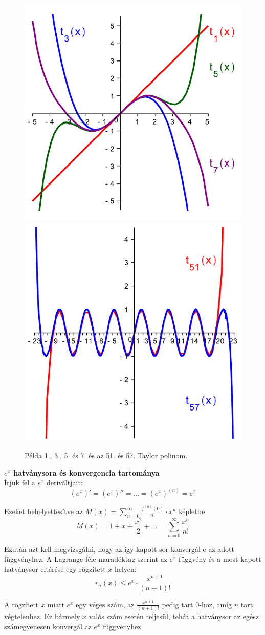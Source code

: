 \documentclass[tikz,12pt,margin=0px]{article}
\newcommand\ddfrac[2]{\frac{\displaystyle #1}{\displaystyle #2}}
\begin{document}
	\begin{figure}[H]
		\centering
		\includegraphics[width=0.48\linewidth]{img/taylor_sinx_1_3_5_7.png}
		\includegraphics[width=0.48\linewidth]{img/taylor_sinx_51_57.png}
		\caption{Példa 1., 3., 5. és 7. és az 51. és 57. Taylor polinom.}
		\label{fig:newton_pelda}
	\end{figure}

\newpage
    \noindent \textbf{${e^{x}}$ hatványsora és konvergencia tartománya}\\

    \noindent Írjuk fel a $e^{x}$ deriváltjait:
    \[
        (e^{x})' = (e^{x})'' = \ldots = (e^{x})^{(n)} = e^{x}
    \]

    \noindent Ezeket behelyettesítve az $M(x) = \sum\limits_{n=0}^{\infty}\ddfrac{f^{(n)}(0)}{n!} \cdot x^{n}$ képletbe
    \[
        M(x) = 1 + x + \ddfrac{x^2}{2} + \ldots = \sum\limits_{n=0}^{\infty}\ddfrac{x^{n}}{n!}
    \]

    \noindent Ezután azt kell megvizsgálni, hogy az így kapott sor konvergál-e az adott függvényhez. A Lagrange-féle maradéktag szerint az $e^{x}$ függvény és a most kapott hatványsor eltérése egy rögzített $x$ helyen:
    \[
        r_{n}(x) \leq e^{x} \cdot \ddfrac{x^{n+1}}{(n+1)!}
    \]

    \noindent A rögzített $x$ miatt $e^{x}$ egy véges szám, az $\ddfrac{x^{n+1}}{(n+1)!}$ pedig tart 0-hoz, amíg $n$ tart végtelenhez. Ez bármely $x$ valós szám esetén teljesül, tehát a hatványsor az egész számegyenesen konvergál az $e^{x}$ függvényhez.\\
\end{document}
